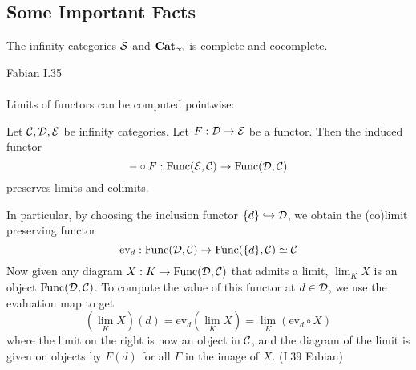 \documentclass[a4paper]{article}
\begin{document}
\subsection{Some Important Facts}
\begin{prp}{}{} The infinity categories $\mathcal{S}$ and $\bold{Cat}_\infty$ is complete and cocomplete. 
\end{prp}

Fabian I.35\\~\\

Limits of functors can be computed pointwise: 

\begin{prp}{}{} Let $\mathcal{C},\mathcal{D},\mathcal{E}$ be infinity categories. Let $F:\mathcal{D}\to\mathcal{E}$ be a functor. Then the induced functor $$-\circ F:\text{Func}(\mathcal{E},\mathcal{C})\to\text{Func}(\mathcal{D},\mathcal{C})$$ preserves limits and colimits. 
\end{prp}

In particular, by choosing the inclusion functor $\{d\}\hookrightarrow\mathcal{D}$, we obtain the (co)limit preserving functor $$\text{ev}_d:\text{Func}(\mathcal{D},\mathcal{C})\to\text{Func}(\{d\},\mathcal{C})\simeq\mathcal{C}$$ Now given any diagram $X:K\to\text{Func}(\mathcal{D},\mathcal{C})$ that admits a limit, $\lim_K X$ is an object $\text{Func}(\mathcal{D},\mathcal{C})$. To compute the value of this functor at $d\in\mathcal{D}$, we use the evaluation map to get $$\left(\lim_K X\right)(d)=\text{ev}_d\left(\lim_KX\right)=\lim_K(\text{ev}_d\circ X)$$ where the limit on the right is now an object in $\mathcal{C}$, and the diagram of the limit is given on objects by $F(d)$ for all $F$ in the image of $X$. (I.39 Fabian)
\end{document}
